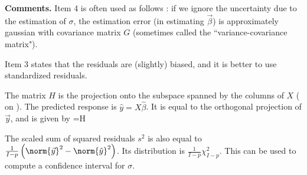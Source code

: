 \textbf{Comments. }
Item 4 is often used as follows : if we ignore the uncertainty due to the estimation of $\sigma$, the estimation error (in estimating $\vec{\beta}$) is approximately gaussian with covariance matrix $G$ (sometimes called the ``variance-covariance matrix").


Item 3 states that the residuals are
(slightly) biased, and it is better to use standardized
residuals.

The matrix $H$ is the projection onto the subspace spanned by
the columns of $X$ ( on
). The predicted response is $\hat{y}=X
\hat{\beta}$. It is equal to the orthogonal projection of
$\vec{y}$, and is given by
 \be {}=H \label{eq:predresp:lin}\ee

The scaled sum of squared residuals $s^2$ is also equal to
$\frac{1}{I-p}\left(\norm{\vec{y}}^2- \norm{\hat{y}}^2\right)$.
Its distribution is $\frac{1}{I-p}\chi^2_{I-p}$. This can be
used to compute a confidence interval for $\sigma$.



